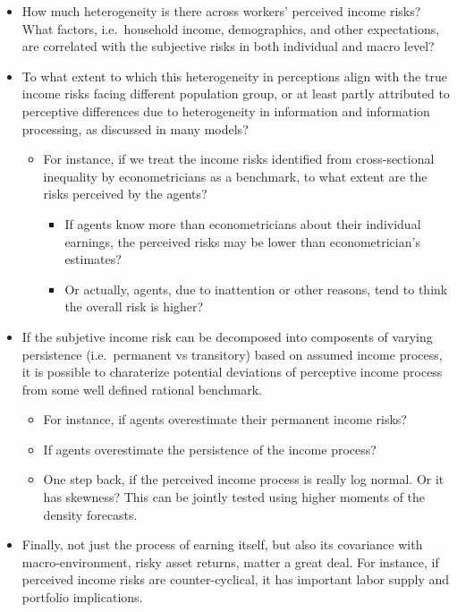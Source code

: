 \documentclass[12pt,notitlepage,onecolumn,aps,pra]{revtex4-1}
\providecommand{\tightlist}{%
      \setlength{\itemsep}{0pt}\setlength{\parskip}{0pt}}
\begin{document}
\begin{itemize}
\item
  How much heterogeneity is there across workers' perceived income
  risks? What factors, i.e.~household income, demographics, and other
  expectations, are correlated with the subjective risks in both
  individual and macro level?
\item
  To what extent to which this heterogeneity in perceptions align with
  the true income risks facing different population group, or at least
  partly attributed to perceptive differences due to heterogeneity in
  information and information processing, as discussed in many models?

  \begin{itemize}
  \tightlist
  \item
    For instance, if we treat the income risks identified from
    cross-sectional inequality by econometricians as a benchmark, to
    what extent are the risks perceived by the agents?

    \begin{itemize}
    \tightlist
    \item
      If agents know more than econometricians about their individual
      earnings, the perceived risks may be lower than econometrician's
      estimates?
    \item
      Or actually, agents, due to inattention or other reasons, tend to
      think the overall risk is higher?
    \end{itemize}
  \end{itemize}
\item
  If the subjetive income risk can be decomposed into composents of
  varying persistence (i.e.~permanent vs transitory) based on assumed
  income process, it is possible to charaterize potential deviations of
  perceptive income process from some well defined rational benchmark.

  \begin{itemize}
  \tightlist
  \item
    For instance, if agents overestimate their permanent income risks?
  \item
    If agents overestimate the persistence of the income process?
    \cite{rozsypal_overpersistence_2017}
  \item
    One step back, if the perceived income process is really log normal.
    Or it has skewness? This can be jointly tested using higher moments
    of the density forecasts.
  \end{itemize}
\item
  Finally, not just the process of earning itself, but also its
  covariance with macro-environment, risky asset returns, matter a great
  deal. For instance, if perceived income risks are counter-cyclical, it
  has important labor supply and portfolio implications.
  \cite{catherine_countercyclical_2019}
\end{itemize}
\end{document}

